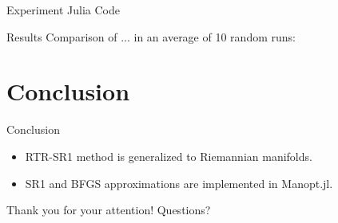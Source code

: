 \documentclass{beamer}
\begin{document}
\begin{frame}{Experiment}
    Julia Code
\end{frame}

\begin{frame}{Results}
    Comparison of ... in an average of 10 random runs:
    \begin{table}[H]
    \end{table}
\end{frame}

\section{Conclusion}

\begin{frame}{Conclusion}
    \begin{itemize}
        \item RTR-SR1 method is generalized to Riemannian manifolds.
        \item SR1 and BFGS approximations are implemented in Manopt.jl.
    \end{itemize}
    \begin{center}
        Thank you for your attention! Questions? 
    \end{center}
\end{frame}
\end{document}

